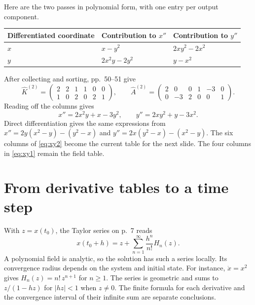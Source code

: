 \documentclass[11pt,letterpaper]{article}
\newcommand{\src}[1]{\par\smallskip\noindent{\small\itshape Notebook, #1.}\par\medskip}
\begin{document}
Here are the two passes in polynomial form, with one entry per output component.
\begin{center}
\begin{tabular}{@{}lll@{}}
\toprule
Differentiated coordinate & Contribution to \(x''\) & Contribution to \(y''\)\\
\midrule
\(x\) & \(x-y^2\) & \(2xy^2-2x^2\)\\
\(y\) & \(2x^2y-2y^2\) & \(y-x^2\)\\
\bottomrule
\end{tabular}
\end{center}
After collecting and sorting, pp.~50--51 give
\begin{equation}\label{eq:xy2}
 \widehat K^{(2)}=\begin{pmatrix}2&2&1&1&0&0\\1&0&2&0&2&1\end{pmatrix},
 \qquad
 \widehat A^{(2)}=\begin{pmatrix}2&0&0&1&-3&0\\0&-3&2&0&0&1\end{pmatrix}.
\end{equation}
Reading off the columns gives
\begin{equation}\label{eq:xyD2}
 x''=2x^2y+x-3y^2,\qquad y''=2xy^2+y-3x^2 .
\end{equation}
Direct differentiation gives the same expressions from
\(x''=2y(x^2-y)-(y^2-x)\) and \(y''=2x(y^2-x)-(x^2-y)\).
The six columns of \eqref{eq:xy2} become the current table for the next
slide. The four columns in \eqref{eq:xy1} remain the field table.
\src{pp.~22, 45, 47--53}

\section{From derivative tables to a time step}\label{sec:taylor}
With \(z=x(t_0)\), the Taylor series on p.~7 reads
\begin{equation}\label{eq:series}
 x(t_0+h)=z+\sum_{n=1}^{\infty}\frac{h^n}{n!}H_n(z).
\end{equation}
A polynomial field is analytic, so the solution has such a series locally.
Its convergence radius depends on the system and initial state. For instance,
\(\dot x=x^2\) gives \(H_n(z)=n!\,z^{n+1}\) for \(n\ge1\). The series is
geometric and sums to \(z/(1-hz)\) for \(|hz|<1\) when \(z\ne0\). The finite
formula for each derivative and the convergence interval of their infinite sum
are separate conclusions.
\end{document}
